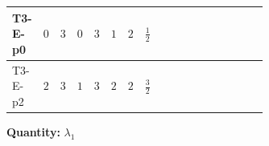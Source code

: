 \documentclass[8pt]{article}
\begin{document}
\begin{landscape}
\begin{longtable}{@{}llcccccc >{\raggedright\arraybackslash}p{0.21\linewidth} >{\raggedright\arraybackslash}p{0.21\linewidth} >{\raggedright\arraybackslash}p{0.21\linewidth}@{}}
\midrule
T3-E-p0 & $0$ & $3$ & $0$ & $3$ & $1$ & $2$ & $\frac{1}{2}$ & \scriptsize\adjustbox{max width=\linewidth}{$\begin{gathered} +{g_1}^2 \left(\frac{3 {g_2}^2}{2}-3 {\lambda_1}\right)\end{gathered}$} & \scriptsize\adjustbox{max width=\linewidth}{$\begin{gathered} -9 {g_2}^2 {\lambda_1}\end{gathered}$} & \scriptsize\adjustbox{max width=\linewidth}{$\begin{gathered} +\frac{3 {g_1}^4}{4}\end{gathered}$} \\
\midrule
T3-E-p2 & $2$ & $3$ & $1$ & $3$ & $2$ & $2$ & $\frac{3}{2}$ & \scriptsize\adjustbox{max width=\linewidth}{$\begin{gathered} +{g_1}^2 \left(\frac{3 {g_2}^2}{2}-3 {\lambda_1}\right)\end{gathered}$} & \scriptsize\adjustbox{max width=\linewidth}{$\begin{gathered} -9 {g_2}^2 {\lambda_1}\end{gathered}$} & \scriptsize\adjustbox{max width=\linewidth}{$\begin{gathered} +\frac{3 {g_1}^4}{4}\end{gathered}$} \\
\midrule
\bottomrule
\end{longtable}
\clearpage
\noindent\textbf{Quantity: }$\lambda_1$\par\smallskip

\end{landscape}
\end{document}
